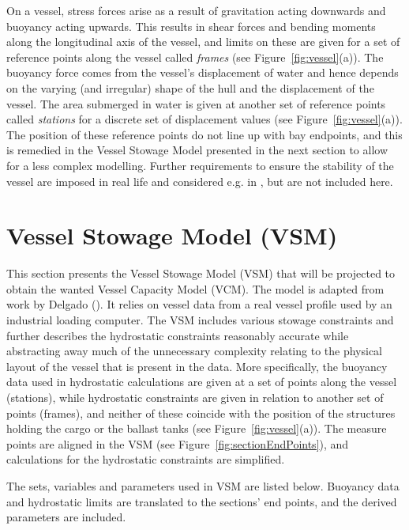 \documentclass[citeauthoryear]{llncs}
\begin{document}
On a vessel, stress forces arise as a result of gravitation acting downwards and buoyancy acting upwards. This results in shear forces and bending moments along the longitudinal axis of the vessel, and limits on these are given for a set of reference points along the vessel called \emph{frames} (see Figure~\ref{fig:vessel}(a)). The buoyancy force comes from the vessel's displacement of water and hence depends on the varying (and irregular) shape of the hull and the displacement of the vessel. The area submerged in water is given at another set of reference points called \emph{stations} for a discrete set of displacement values (see Figure~\ref{fig:vessel}(a)).
The position of these reference points do not line up with bay endpoints, and this is remedied in the Vessel Stowage Model presented in the next section to allow for a less complex modelling. Further requirements to ensure the stability of the vessel are imposed in real life and considered e.g. in \cite{AlbertosThesis}, but are not included here.

\section{Vessel Stowage Model (VSM)} \label{sec:stowmodel}
This section presents the Vessel Stowage Model (VSM) that will be projected to obtain the wanted Vessel Capacity Model (VCM). The model is adapted from work by Delgado (\cite{AlbertosThesis}). It relies on vessel data from a real vessel profile used by an industrial loading computer. The VSM includes various stowage constraints and further describes the hydrostatic constraints reasonably accurate while abstracting away much of the unnecessary complexity relating to the physical layout of the vessel that is present in the data. More specifically, the buoyancy data used in hydrostatic calculations are given at a set of points along the vessel (stations), while hydrostatic constraints are given in relation to another set of points (frames), and neither of these coincide with the position of the structures holding the cargo or the ballast tanks (see Figure~\ref{fig:vessel}(a)). The measure points are aligned in the VSM (see Figure~\ref{fig:sectionEndPoints}), and calculations for the hydrostatic constraints are simplified. 

The sets, variables and parameters used in VSM are listed below. Buoyancy data and hydrostatic limits are translated to the sections' end points, and the derived parameters are included.
\end{document}
